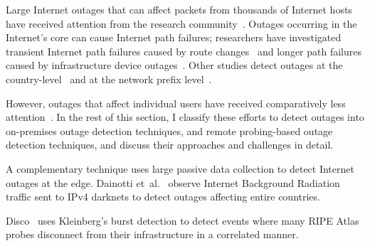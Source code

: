 
Large Internet outages that can affect packets from
thousands of Internet hosts have received attention from the research
community~\cite{censorship-outages, trinocular, hubble, paxson-e2e,
  hubble, netdiagnoser, lifeguard,
  poiroot, phillipa-outages-mailing-list,
  california-fault-lines, delayed-routing-convergence, consensus-routing,
  routing-e2e-path-perf, voip-bgp-convergence}. Outages occurring in the Internet's core can cause Internet
path failures; researchers have
investigated transient Internet path failures caused by route
changes~\cite{delayed-routing-convergence, consensus-routing,
  routing-e2e-path-perf, voip-bgp-convergence} and longer path failures caused by
infrastructure device outages~\cite{paxson-e2e,
  hubble, netdiagnoser, lifeguard,
  poiroot, phillipa-outages-mailing-list,
  california-fault-lines}. Other studies detect outages at the
country-level~\cite{censorship-outages} and at the network prefix
level~\cite{trinocular, hubble}.

However, outages that affect individual users have received comparatively less
attention~\cite{pingin, samknows, ripe-atlas-website,
  grover2013peeking}. In the rest of this
section, I classify these efforts to detect outages into on-premises
outage detection techniques, and remote probing-based outage detection
techniques, and
discuss their approaches and challenges in detail.

A complementary technique uses large passive data collection to detect
Internet outages at the edge. Dainotti et~al.~\cite{dainotti-imc11} observe Internet Background
Radiation traffic sent to IPv4 darknets to detect outages affecting
entire countries. 

Disco~\cite{disco} uses Kleinberg's burst detection to detect
events where many RIPE Atlas probes disconnect from
their infrastructure in a correlated manner.



